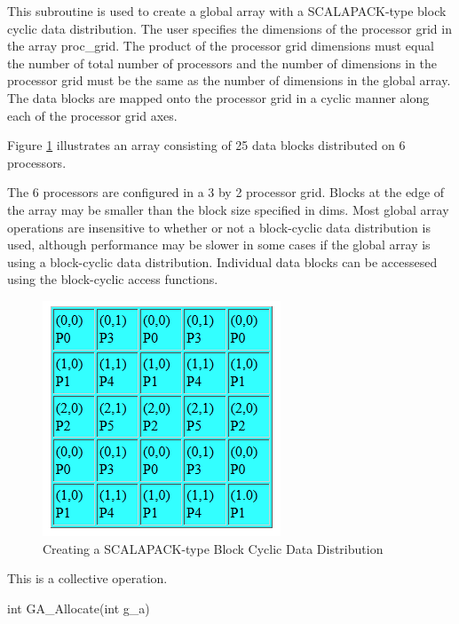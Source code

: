 \documentclass[12pt]{article}
\begin{document}
\begin{desc}

  This subroutine is used to create a global array with a
  SCALAPACK-type block cyclic data distribution. The user specifies
  the dimensions of the processor grid in the array proc_grid. The
  product of the processor grid dimensions must equal the number of
  total number of processors and the number of dimensions in the
  processor grid must be the same as the number of dimensions in the
  global array. The data blocks are mapped onto the processor grid in
  a cyclic manner along each of the processor grid axes. 

Figure \ref{setblkcyprocgrid} illustrates an array consisting of 25 data blocks distributed on 6 processors.

The 6 processors are configured in a 3 by 2 processor grid. Blocks at
the edge of the array may be smaller than the block size specified in dims.
Most global array operations  are insensitive to whether or not a block-cyclic
data distribution is used, although performance may be slower in some cases
if the global array is using a block-cyclic data distribution. Individual data
blocks can be accessesed using the block-cyclic access functions.

\begin{figure}
\centering
\includegraphics{SetBlkCyProcGrid}
\caption{Creating a SCALAPACK-type Block Cyclic Data Distribution}
\label{setblkcyprocgrid}
\end{figure}

  This is a collective operation.

\end{desc}


\begin{capi}
\begin{ccode}
int GA_Allocate(int g_a)
\end{ccode}
\begin{funcargs}
\end{funcargs}
\end{capi}
\end{document}
